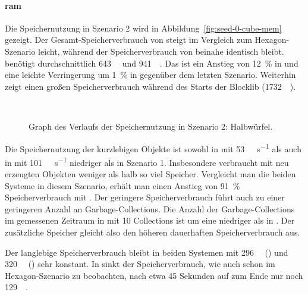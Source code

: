 \paragraph{\ac{ram}} Die Speichernutzung in Szenario 2 wird in Abbildung~\vref{fig:seed-0-cube-mem} gezeigt. Der Ge\-samt-Spei\-cher\-ver\-brauch von \sysA{} steigt im Vergleich zum Hexagon-Szenario leicht, während der Speicherverbrauch von \sysB{} beinahe identisch bleibt. \sysA{} benötigt durchschnittlich \SI{643}{\mega\byte} und \sysB{} \SI{941}{\mega\byte}. Das ist ein Anstieg von \SI{12}{\percent} in \sysA{} und eine leichte Verringerung um \SI{1}{\percent} in \sysB{} gegenüber dem letzten Szenario. Weiterhin zeigt \sysB{} einen großen Speicherverbrauch während des Starts der Blocklib (\SI{1732}{\mega\byte}).

\begin{figure}[!htb]
	\\
	\caption{Graph des Verlaufs der Speichernutzung in Szenario 2: Halbwürfel.}\label{fig:seed-0-cube-mem}
\end{figure} 

Die Speichernutzung der kurzlebigen Objekte ist sowohl in \sysA{} mit \SI{53}{\mega\byte\per\second} als auch in \sysB{} mit \SI{101}{\mega\byte\per\second} niedriger als in Szenario 1. Insbesondere \sysB{} verbraucht mit neu erzeugten Objekten weniger als halb so viel Speicher. Vergleicht man die beiden Systeme in diesem Szenario, erhält man einen Anstieg von \SI{91}{\percent} Speicherverbrauch mit \sysB{}. Der geringere Speicherverbrauch führt auch zu einer geringeren Anzahl an Garbage-Collections. Die Anzahl der Garbage-Collections im gemessenen Zeitraum in \sysB{} mit 10 Collections ist um eine niedriger als in \sysA{}. Der zusätzliche Speicher gleicht also den höheren dauerhaften Speicherverbrauch aus. 

Der langlebige Speicherverbrauch bleibt in beiden Systemen mit \SI{296}{\mega\byte} (\sysA{}) und \SI{320}{\mega\byte} (\sysB{}) sehr konstant. In \sysA{} sinkt der Speicherverbrauch, wie auch schon im Hexagon-Szenario zu beobachten, nach etwa 45 Sekunden auf zum Ende nur noch \SI{129}{\mega\byte}.